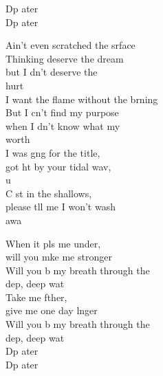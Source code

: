 \begin{cancion}
\begin{chorus}
	\jump
		Dp ater    \\
		Dp ater    \jump\\
	\end{chorus}%
	\jump
	Ain't even scratched the srface\\
	Thinking  deserve the dream \\
	but I dn't deserve the \\
	hurt\\
	I want the flame without the brning\\
	But I cn't find my purpose \\
	when I dn't know what my \\
	worth \\
	\jump
	I was gng for the title, \\
	got ht by your tidal wav, \\
	u\\
	C st in the shallows, \\
	please tll me I won't wash\\
	 awa  \jump\\
	\begin{chorus}%
		When it pls me under, \\
		will you mke me stronger\\
		Will you b my breath through the \\
		dep, deep wat\\
		Take me fther, \\
		give me one day lnger\\
		Will you b my breath through the \\
		dep, deep wat\\
	\jump
		Dp ater    \\
		Dp ater  \jump\\
	\end{chorus}%

\end{cancion}
